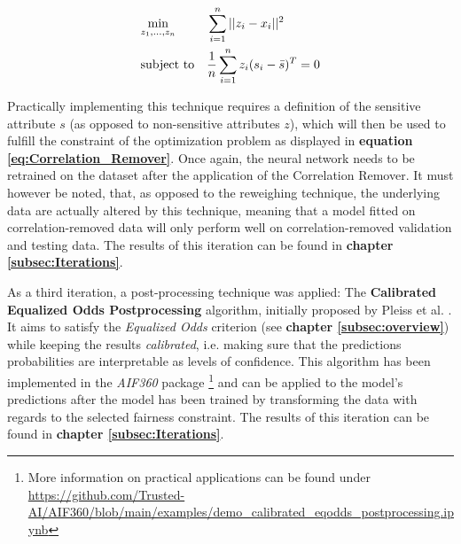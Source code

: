 \begin{equation}
    \begin{aligned}
        & \underset{z_1, \ldots, z_n}{\text{min}}
        & & \sum_{i=1}^n ||z_i - x_i||^2 \\
        & \text{subject to}
        & & \frac{1}{n} \sum_{i=1}^n z_i (s_i - \bar{s})^T = 0
        \end{aligned}
    \label{eq:Correlation_Remover}
    \addcontentsline{frm}{formulas}{\protect\numberline{\theequation}\hspace{1em}Correlation Remover}
\end{equation}

Practically implementing this technique requires a definition of the sensitive attribute $s$ (as opposed to non-sensitive attributes $z$), which will then be used to fulfill the constraint of the optimization problem as displayed in \textbf{equation \ref{eq:Correlation_Remover}}. 
Once again, the neural network needs to be retrained on the dataset after the application of the Correlation Remover. It must however be noted, that, as opposed to the reweighing technique, the underlying data are actually altered by this technique, meaning that a model fitted on correlation-removed data will only perform well on correlation-removed validation and testing data. The results of this iteration can be found in \textbf{chapter \ref{subsec:Iterations}}.

As a third iteration, a post-processing technique was applied: The \textbf{Calibrated Equalized Odds Postprocessing} algorithm, initially proposed by Pleiss et al. \parencite{Pleiss2017}. It aims to satisfy the \textit{Equalized Odds} criterion (see \textbf{chapter \ref{subsec:overview}}) while keeping the results \textit{calibrated}, i.e. making sure that the predictions probabilities are interpretable as levels of confidence.
This algorithm has been implemented in the \textit{AIF360} package \footnote{More information on practical applications can be found under \url{https://github.com/Trusted-AI/AIF360/blob/main/examples/demo_calibrated_eqodds_postprocessing.ipynb}} and can be applied to the model's predictions after the model has been trained by transforming the data with regards to the selected fairness constraint. The results of this iteration can be found in \textbf{chapter \ref{subsec:Iterations}}. 

